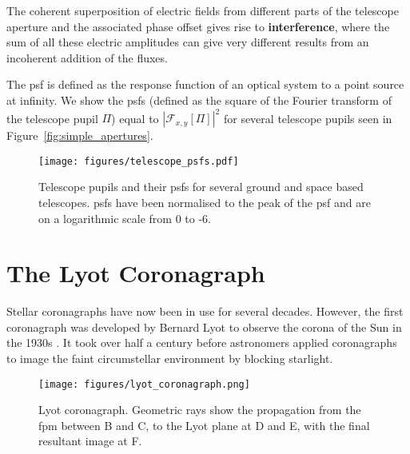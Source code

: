 \documentclass[letterpaper]{ar-1col}
\begin{document}


The coherent superposition of electric fields from different parts of the telescope aperture and the associated phase offset gives rise to \textbf{interference}, where the sum of all these electric amplitudes can give very different results from an incoherent addition of the fluxes.

The \ac{psf} is defined as the response function of an optical system to a point source at infinity.
%
We show the \acp{psf} (defined as the square of the Fourier transform of the telescope pupil $\Pi$) equal to $|\mathcal{F}_{x,y}[\Pi]|^2$ for several telescope pupils seen in Figure~\ref{fig:simple_apertures}.

\begin{figure}[ht]
  \centering
  \texttt{[image: figures/telescope\_psfs.pdf]}
  \caption{Telescope pupils and their \acp{psf} for several ground and space based telescopes.
  \acp{psf} have been normalised to the peak of the \ac{psf} and are on a logarithmic scale from 0 to -6.}
  \label{fig:telpsfs}
\end{figure}


\section{The Lyot Coronagraph}

Stellar coronagraphs have now been in use for several decades.
%
However, the first coronagraph was developed by Bernard Lyot to observe the corona of the Sun in the 1930s \citep{Lyot39}.
%
It took over half a century before astronomers applied coronagraphs to image the faint circumstellar environment by blocking starlight. 

\begin{figure}[ht]
  \centering
  \texttt{[image: figures/lyot\_coronagraph.png]}
  \caption{Lyot coronagraph.
  Geometric rays show the propagation from the \ac{fpm} between B and C, to the Lyot plane at D and E, with the final resultant image at F.}
  \label{fig:lyot}
\end{figure}
\end{document}
